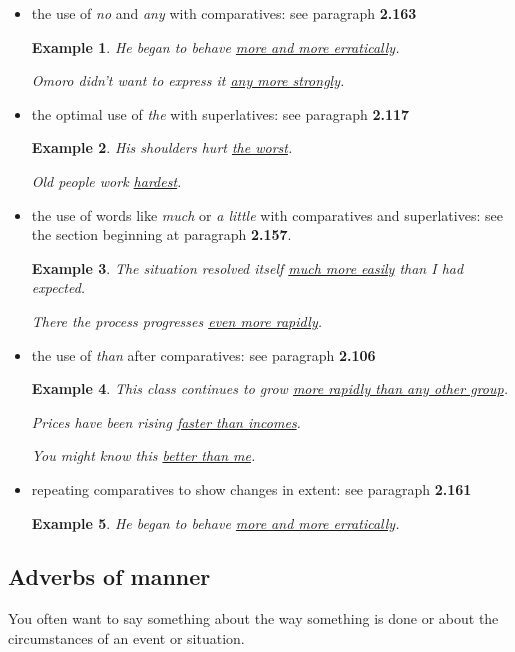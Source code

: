 \documentclass[oneside]{book}
\numberwithin{equation}{section}
\newtheorem{example}{Example}[section]
\begin{document}
\begin{itemize}
    \item the use of \textit{no} and \textit{any} with comparatives: see paragraph \textbf{2.163}
    \begin{example}
        He began to behave \underline{more and more erratically}.
        
        Omoro didn't want to express it \underline{any more strongly}.
    \end{example}
    \item the optimal use of \textit{the} with superlatives: see paragraph \textbf{2.117}
    \begin{example}
        His shoulders hurt \underline{the worst}.
        
        Old people work \underline{hardest}.
    \end{example}
    \item the use of words like \textit{much} or \textit{a little} with comparatives and superlatives: see the section beginning at paragraph \textbf{2.157}.
    \begin{example}
        The situation resolved itself \underline{much more easily} than I had expected.
        
        There the process progresses \underline{even more rapidly}.
    \end{example}
    \item the use of \textit{than} after comparatives: see paragraph \textbf{2.106}
    \begin{example}
        This class continues to grow \underline{more rapidly than any other group}.
        
        Prices have been rising \underline{faster than incomes}.
        
        You might know this \underline{better than me}.
    \end{example}
    \item repeating comparatives to show changes in extent: see paragraph \textbf{2.161}
    \begin{example}
        He began to behave \underline{more and more erratically}.
    \end{example}
\end{itemize}

\subsection{Adverbs of manner}
\noindent{} You often want to say something about the way something is done or about the circumstances of an event or situation.
\end{document}
